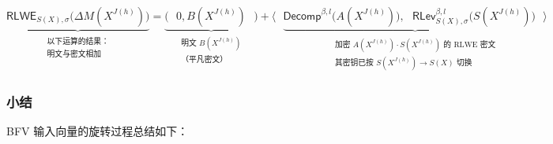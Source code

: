 $ $

\noindent $\underbrace{\textsf{RLWE}_{S(X),\sigma}\bm{(}\Delta M(X^{J(h)})\bm{)}}_{\substack{\text{以下运算的结果：} \\ \text{明文与密文相加}}} = \underbrace{\bm{(} \text{ } 0, B(X^{J(h)}) \text{ } \bm{)}}_{\substack{\text{明文 } B(X^{J(h)}) \\ \text{（平凡密文）}}} + \bm{\langle} \text{ } \underbrace{\textsf{Decomp}^{\beta, l}\bm{(}A(X^{J(h)})\bm{)}, \text{ } \textsf{RLev}_{S(X), \sigma}^{\beta, l}\bm{(}S(X^{J(h)})\bm{)} \text{ } \bm{\rangle}}_{\substack{\substack{\text{加密 $A(X^{J(h)}) \cdot S(X^{J(h)})$ 的 RLWE 密文}\\ \text{其密钥已按 $S(X^{J(h)})\rightarrow S(X)$ 切换}}}}$



\subsubsection{小结}
\label{subsubsec:bfv-rotation-summary}

BFV 输入向量的旋转过程总结如下：

